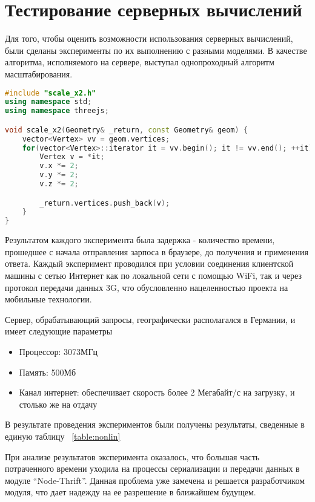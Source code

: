 \section{Тестирование серверных вычислений}

Для того, чтобы оценить возможности использования серверных вычислений, были
сделаны эксперименты по их выполнению с разными моделями. В качестве алгоритма,
исполняемого на сервере, выступал однопроходный алгоритм масштабирования.

\begin{lstlisting}[language=c++]
#include "scale_x2.h"
using namespace std;
using namespace threejs;

void scale_x2(Geometry& _return, const Geometry& geom) {
    vector<Vertex> vv = geom.vertices;
    for(vector<Vertex>::iterator it = vv.begin(); it != vv.end(); ++it) {
        Vertex v = *it;
        v.x *= 2;
        v.y *= 2;
        v.z *= 2;

        _return.vertices.push_back(v);
    }
}
\end{lstlisting}

Результатом каждого эксперимента была задержка - количество времени, прошедшее
с начала отправления зарпоса в браузере, до получения и применения ответа.
Каждый эксперимент проводился при условии соединения клиентской машины с сетью
Интернет как по локальной сети с помощью WiFi, так и через протокол передачи
данных 3G, что обусловленно нацеленностью проекта на мобильные технологии.

Сервер, обрабатывающий запросы, географически располагался в Германии, и имеет
следующие параметры
\begin{itemize}
    \item Процессор: 3073МГц
    \item Память: 500Мб
    \item Канал интернет: обеспечивает скорость более 2 Мегабайт/с на загрузку, и
    столько же на отдачу
\end{itemize}

В результате проведения экспериментов были получены результаты,
сведенные в единую таблицу ~\ref{table:nonlin}

\begin{table}[ht]
\begin{center}
\end{center}
\caption{Задержка серверных вычислений}
\label{table:nonlin}
\end{table}

При анализе результатов эксперимента оказалось, что большая часть потраченного
времени уходила на процессы сериализации и передачи данных в модуле
``Node-Thrift''. Данная проблема уже замечена и решается разработчиком модуля,
что дает надежду на ее разрешение в ближайшем будущем.

